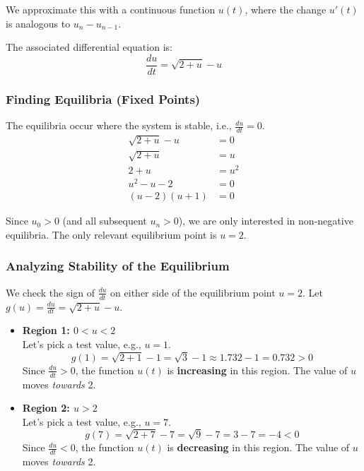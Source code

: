 \documentclass[12pt,a4paper]{article}
\theoremstyle{definition}
\begin{document}
We approximate this with a continuous function $u(t)$, where the change $u'(t)$ is analogous to $u_n - u_{n-1}$.

The associated differential equation is:
\begin{equation}
\frac{du}{dt} = \sqrt{2 + u} - u
\end{equation}

\subsubsection{Finding Equilibria (Fixed Points)}

The equilibria occur where the system is stable, i.e., $\frac{du}{dt} = 0$.
\begin{align*}
\sqrt{2 + u} - u &= 0\\
\sqrt{2 + u} &= u\\
2 + u &= u^2\\
u^2 - u - 2 &= 0\\
(u - 2)(u + 1) &= 0
\end{align*}

Since $u_0 > 0$ (and all subsequent $u_n > 0$), we are only interested in non-negative equilibria. The only relevant equilibrium point is \textbf{$u = 2$}.

\subsubsection{Analyzing Stability of the Equilibrium}

We check the sign of $\frac{du}{dt}$ on either side of the equilibrium point $u=2$. Let $g(u) = \frac{du}{dt} = \sqrt{2 + u} - u$.

\begin{itemize}
    \item \textbf{Region 1: $0 < u < 2$}\\
    Let's pick a test value, e.g., $u = 1$.
    \[
    g(1) = \sqrt{2 + 1} - 1 = \sqrt{3} - 1 \approx 1.732 - 1 = 0.732 > 0
    \]
    Since $\frac{du}{dt} > 0$, the function $u(t)$ is \textbf{increasing} in this region. The value of $u$ moves \textit{towards} 2.
    
    \item \textbf{Region 2: $u > 2$}\\
    Let's pick a test value, e.g., $u = 7$.
    \[
    g(7) = \sqrt{2 + 7} - 7 = \sqrt{9} - 7 = 3 - 7 = -4 < 0
    \]
    Since $\frac{du}{dt} < 0$, the function $u(t)$ is \textbf{decreasing} in this region. The value of $u$ moves \textit{towards} 2.
\end{itemize}
\end{document}
